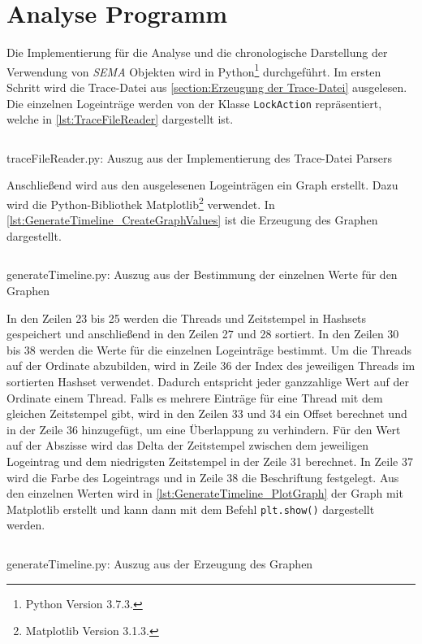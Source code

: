 \section{Analyse Programm}
\label{section:Implementierung:Analyse Programm}
Die Implementierung für die Analyse und die chronologische Darstellung der
Verwendung von \textit{SEMA} Objekten wird in Python\footnote{Python Version
3.7.3.} durchgeführt. Im ersten Schritt wird die Trace-Datei aus
\cref{section:Erzeugung der Trace-Datei} ausgelesen. Die einzelnen Logeinträge
werden von der Klasse
\texttt{Lock\-Action} repräsentiert, welche in \cref{lst:TraceFileReader}
dargestellt ist.
\begin{listing}[ht]
  \inputminted[frame=lines,linenos,firstline=1,lastline=10]{python}{./Python/traceFileReader.py}
  \caption{traceFileReader.py: Auszug aus der Implementierung des Trace-Datei Parsers}
  \label{lst:TraceFileReader}
\end{listing}
Anschließend wird aus den ausgelesenen Logeinträgen ein Graph erstellt. Dazu
wird die Python-Bibliothek Matplotlib\footnote{Matplotlib Version 3.1.3.}
verwendet. In \cref{lst:GenerateTimeline_CreateGraphValues} ist die Erzeugung
des Graphen dargestellt.
\begin{listing}[ht]
  \inputminted[frame=lines,linenos,firstline=16,lastline=38]{python}{./Python/generateTimeline.py}
  \caption{generateTimeline.py: Auszug aus der Bestimmung der einzelnen Werte für den Graphen}
  \label{lst:GenerateTimeline_CreateGraphValues}
\end{listing}
In den Zeilen 23 bis 25 werden die Threads und Zeitstempel in Hashsets
gespeichert und anschließend in den Zeilen 27 und 28 sortiert. In den Zeilen 30
bis 38 werden die Werte für die einzelnen Logeinträge bestimmt. Um die Threads
auf der Ordinate abzubilden, wird in Zeile 36 der Index des jeweiligen Threads
im sortierten Hashset verwendet. Dadurch entspricht jeder ganzzahlige Wert auf
der Ordinate einem Thread. Falls es mehrere Einträge für eine Thread mit dem
gleichen Zeitstempel gibt, wird in den Zeilen 33 und 34 ein Offset berechnet und
in der Zeile 36 hinzugefügt, um eine Überlappung zu verhindern. Für den Wert auf
der Abszisse wird das Delta der Zeitstempel zwischen dem jeweiligen Logeintrag
und dem niedrigsten Zeitstempel in der Zeile 31 berechnet. In Zeile 37 wird die
Farbe des Logeintrags und in Zeile 38 die Beschriftung festgelegt. Aus den
einzelnen Werten wird in \cref{lst:GenerateTimeline_PlotGraph} der Graph mit
Matplotlib erstellt und kann dann mit dem Befehl \texttt{plt.show()} dargestellt
werden.
\begin{listing}[ht]
  \inputminted[frame=lines,linenos,firstline=42,lastline=44]{python}{./Python/generateTimeline.py}
  \caption{generateTimeline.py: Auszug aus der Erzeugung des Graphen}
  \label{lst:GenerateTimeline_PlotGraph}
\end{listing}

